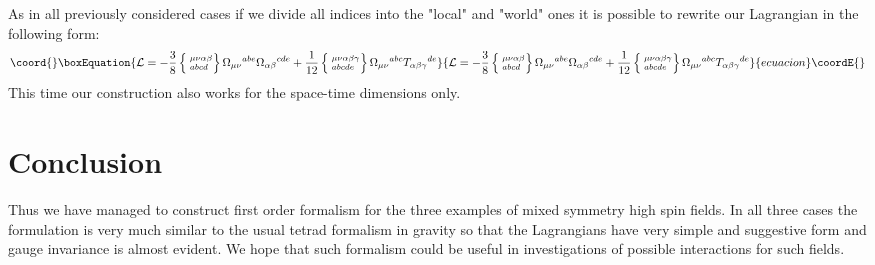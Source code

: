 \documentclass[a4paper,12pt]{article}
\begin{document}
As in all previously considered cases if we divide all indices into
the "local" and "world" ones it is possible to rewrite our Lagrangian
in the following form:
\begin{equation}\coord{}\boxEquation{
{\cal L} = - \frac{3}{8} \left\{
\phantom{|}^{\mu\nu\alpha\beta}_{abcd} \right\}
\Omega_{\mu\nu}{}^{abe} \Omega_{\alpha\beta}{}^{cde} + \frac{1}{12}
\left\{ \phantom{|}^{\mu\nu\alpha\beta\gamma}_{abcde} \right\}
\Omega_{\mu\nu}{}^{abc} T_{\alpha\beta\gamma}{}^{de}
}{
{\cal L} = - \frac{3}{8} \left\{
\phantom{|}^{\mu\nu\alpha\beta}_{abcd} \right\}
\Omega_{\mu\nu}{}^{abe} \Omega_{\alpha\beta}{}^{cde} + \frac{1}{12}
\left\{ \phantom{|}^{\mu\nu\alpha\beta\gamma}_{abcde} \right\}
\Omega_{\mu\nu}{}^{abc} T_{\alpha\beta\gamma}{}^{de}
}{ecuacion}\coordE{}\end{equation}
This time our construction also works for the space-time dimensions
\coordHE{} only.


\section*{Conclusion}

Thus we have managed to construct first order formalism for the three
examples of mixed symmetry high spin fields. In all three cases the
formulation is very much similar to the usual tetrad formalism in
gravity so that the Lagrangians have very simple and suggestive form
and gauge invariance is almost evident. We hope that such formalism
could be useful in investigations of possible interactions for such
fields.


\newpage
\end{document}
